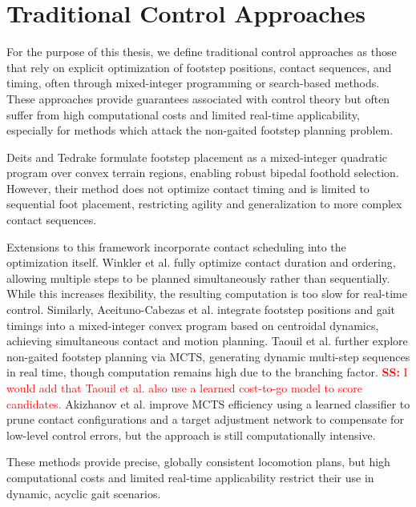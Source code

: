 \section{Traditional Control Approaches}
\label{sec:background-traditional-control}

For the purpose of this thesis, we define traditional control
approaches as those that rely on explicit optimization of footstep
positions, contact sequences, and timing, often through mixed-integer
programming or search-based methods. These approaches provide
guarantees associated with control theory but often suffer from high
computational costs and limited real-time applicability, especially
for methods which attack the non-gaited footstep planning problem.

Deits and Tedrake \cite{deits_footstep_2014} formulate footstep
placement as a mixed-integer quadratic program over convex terrain
regions, enabling robust bipedal foothold selection. However, their
method does not optimize contact timing and is limited to sequential
foot placement, restricting agility and generalization to more
complex contact sequences.

Extensions to this framework incorporate contact scheduling into the
optimization itself. Winkler et al. \cite{winkler_gait_2018} fully
optimize contact duration and ordering, allowing multiple steps to be
planned simultaneously rather than sequentially. While this increases
flexibility, the resulting computation is too slow for real-time
control. Similarly, Aceituno-Cabezas et al.
\cite{aceituno_simultaneous_2019} integrate footstep positions and
gait timings into a mixed-integer convex program based on centroidal
dynamics, achieving simultaneous contact and motion planning. Taouil
et al. \cite{taouil_non-gaited_2024} further explore non-gaited
footstep planning via MCTS, generating dynamic multi-step sequences
in real time, though computation remains high due to the branching
factor. \textcolor{red}{\textbf{SS:} I would add that Taouil et al.
also use a learned cost-to-go model to score candidates.}
Akizhanov et al.
\cite{akizhanov_learning_2024} improve MCTS efficiency using a
learned classifier to prune contact configurations and a target
adjustment network to compensate for low-level control errors, but
the approach is still computationally intensive.

These methods provide precise, globally consistent locomotion plans,
but high computational costs and limited real-time applicability
restrict their use in dynamic, acyclic gait scenarios.
